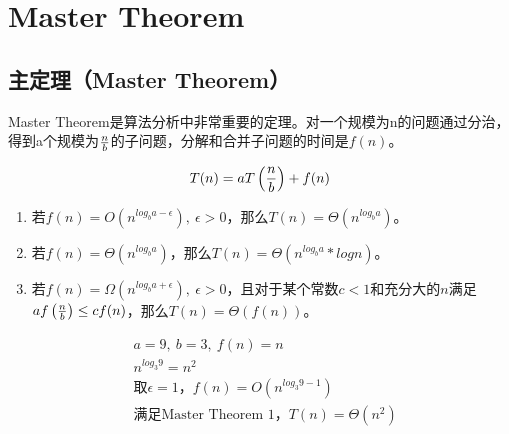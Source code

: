 \section{Master Theorem}

\subsection{主定理（Master Theorem）}

Master Theorem是算法分析中非常重要的定理。对一个规模为n的问题通过分治，得到a个规模为$ n \over b $的子问题，分解和合并子问题的时间是$ f(n) $。

$$
    T(n) = aT\left( {n \over b} \right) + f(n)
$$

\begin{enumerate}
    \item 若$ f(n) = O \left( n^{log_b{a-\epsilon}} \right),\ \epsilon > 0 $，那么$ T(n) = \Theta \left( n^{log_b{a}} \right) $。

    \item 若$ f(n) = \Theta \left( n^{log_b{a}} \right) $，那么$ T(n) = \Theta \left( n^{log_b{a}} * logn \right) $。

    \item 若$ f(n) = \Omega \left( n^{log_b{a+\epsilon}} \right),\ \epsilon > 0 $，且对于某个常数$ c < 1 $和充分大的$ n $满足$ af\left( {n \over b} \right) \le cf(n) $，那么$ T(n) = \Theta(f(n)) $。
\end{enumerate}

\vspace{0.5cm}


\vspace{-0.5cm}

\begin{align*}
     & a = 9,\ b = 3,\ f(n) = n                                             \\
     & n^{log_3{9}} = n^2                                                   \\
     & \text{取}\epsilon = 1\text{，}f(n) = O \left( n^{log_3{9-1}} \right) \\
     & \text{满足Master Theorem 1，}T(n) = \Theta(n^2)
\end{align*}

\vspace{0.5cm}


\vspace{-0.5cm}

